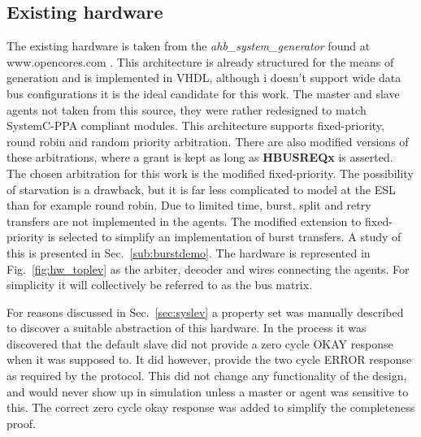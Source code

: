 \subsection{Existing hardware}
\label{sub:exist}

The existing hardware is taken from the \textit{ahb\_system\_generator} found at \\
 www.opencores.com \cite{ahbsys}. This architecture is already structured for the means of generation and is implemented in VHDL, although i doesn't support wide data bus configurations it is the ideal candidate for this work. The master and slave agents   not taken from this source, they were rather redesigned to match SystemC-PPA compliant modules. This architecture supports fixed-priority, round robin and random priority arbitration. There are also modified versions of these arbitrations, where a grant is kept as long as \textbf{HBUSREQx} is asserted. The chosen arbitration for this work is the modified fixed-priority. The possibility of starvation is a drawback, but it is far less complicated to model at the ESL than for example round robin. Due to limited time, burst, split and retry transfers are not implemented in the agents. The modified extension to fixed-priority is selected to simplify an implementation of burst transfers. A study of this is presented in Sec.~\ref{sub:burstdemo}. The hardware is represented in Fig.~\ref{fig:hw_toplev} as the arbiter, decoder and wires connecting the agents. For simplicity it will collectively be referred to as the bus matrix. \par 
For reasons discussed in Sec.~\ref{sec:syslev} a property set was manually described to discover a suitable abstraction of this hardware. In the process it was
discovered that the default slave did not provide a zero cycle OKAY response when it was supposed to. It did however, provide the two cycle ERROR response as 
required by the protocol. This did not change any functionality of the design, and would never show up in simulation unless a master or agent was sensitive to this. The correct zero cycle okay response was added to simplify the completeness proof.  

   
